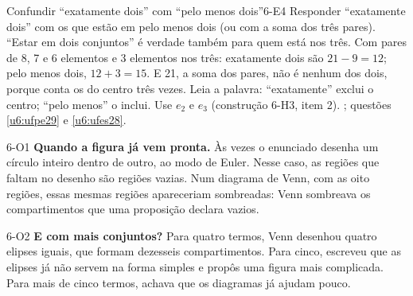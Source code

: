 \begin{erro}{Confundir \enquote{exatamente dois} com \enquote{pelo menos dois}}{6-E4}
 Responder \enquote{exatamente dois} com os que estão em pelo menos dois (ou com a soma dos três pares).
 \enquote{Estar em dois conjuntos} é verdade também para quem está nos três.
 Com pares de 8, 7 e 6 elementos e 3 elementos nos três: exatamente dois são $21-9=12$; pelo menos dois, $12+3=15$. E 21, a soma dos pares, não é nenhum dos dois, porque conta os do centro três vezes.
 Leia a palavra: \enquote{exatamente} exclui o centro; \enquote{pelo menos} o inclui.
 Use $e_2$ e $e_3$ (construção 6-H3, item 2).
 ; questões \ref{u6:ufpe29} e \ref{u6:ufes28}.
\end{erro}

\Observacoes

\begin{obs}{6-O1}
\textbf{Quando a figura já vem pronta.} Às vezes o enunciado desenha um círculo inteiro dentro de outro, ao modo de Euler. Nesse caso, as regiões que faltam no desenho são regiões vazias. Num diagrama de Venn, com as oito regiões, essas mesmas regiões apareceriam sombreadas: Venn sombreava os compartimentos que uma proposição declara vazios.
\end{obs}

\begin{obs}{6-O2}
\textbf{E com mais conjuntos?} Para quatro termos, Venn desenhou quatro elipses iguais, que formam dezesseis compartimentos. Para cinco, escreveu que as elipses já não servem na forma simples e propôs uma figura mais complicada. Para mais de cinco termos, achava que os diagramas já ajudam pouco.
\end{obs}

\Exemplos

